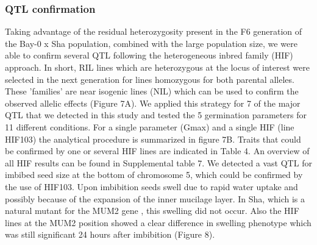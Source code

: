 \subsubsection{QTL confirmation}
Taking advantage of the residual heterozygosity present in the F6 generation of the Bay-0 x Sha population, 
combined with the large population size, we were able to confirm several QTL following the heterogeneous 
inbred family (HIF) approach. In short, RIL lines which are heterozygous at the locus of interest were 
selected in the next generation for lines homozygous for both parental alleles. These 'families' are 
near isogenic lines (NIL) which can be used to confirm the observed allelic effects (Figure 7A). We 
applied this strategy for 7 of the major QTL that we detected in  this study and tested the 5 germination 
parameters for 11 different conditions. For a single parameter (Gmax) and a single HIF (line HIF103) the 
analytical procedure is summarized in figure 7B. Traits that could be confirmed by one or several HIF 
lines are indicated in Table 4. An overview of all HIF results can be found in Supplemental table 7. We 
detected a vast QTL for imbibed seed size at the bottom of chromosome 5, which could be confirmed by the 
use of HIF103. Upon imbibition seeds swell due to rapid water uptake and possibly because of the 
expansion of the inner mucilage layer. In Sha, which is a natural mutant for the MUM2 gene 
\cite{Macquet:2007}, this swelling did not occur. Also the HIF lines at the MUM2 position showed a 
clear difference in swelling phenotype which was still significant 24 hours after imbibition (Figure 8).

